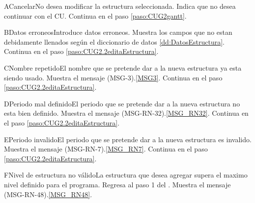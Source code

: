 	\begin{UCtrayectoriaA}{A}{Cancelar}{No desea modificar la estructura seleccionada.}
		\UCpaso[\UCactor] Indica que no desea continuar con el CU.
		\UCpaso Continua en el paso \ref{paso:CUG2gantt}.
	\end{UCtrayectoriaA}

	\begin{UCtrayectoriaA}{B}{Datos erroneos}{Introduce datos erroneos.}
		\UCpaso Muestra los campos que no estan debidamente llenados según el diccionario de datos \ref{dd:DatosEstructura}.
		\UCpaso Continua en el paso \ref{paso:CUG2.2editaEstructura}.
	\end{UCtrayectoriaA}

	\begin{UCtrayectoriaA}{C}{Nombre repetido}{El nombre que se pretende dar a la nueva estructura ya esta siendo usado.}
		\UCpaso Muestra el mensaje (MSG-3).\ref{MSG3}.
		\UCpaso Continua en el paso \ref{paso:CUG2.2editaEstructura}.
	\end{UCtrayectoriaA}

	\begin{UCtrayectoriaA}{D}{Periodo mal definido}{El periodo que se pretende dar a la nueva estructura no esta bien definido.}
		\UCpaso Muestra el mensaje (MSG-RN-32).\ref{MSG_RN32}.
		\UCpaso Continua en el paso \ref{paso:CUG2.2editaEstructura}.
	\end{UCtrayectoriaA}

	\begin{UCtrayectoriaA}{E}{Periodo invalido}{El periodo que se pretende dar a la nueva estructura es invalido.}
		\UCpaso Muestra el mensaje (MSG-RN-7).\ref{MSG_RN7}.
		\UCpaso Continua en el paso \ref{paso:CUG2.2editaEstructura}.
	\end{UCtrayectoriaA}

	\begin{UCtrayectoriaA}{F}{Nivel de estructura no válido}{La estructura que desea agregar supera el maximo nivel definido para el programa.}
		\UCpaso Regresa al paso 1 del .
		\UCpaso Muestra el mensaje (MSG-RN-48).\ref{MSG_RN48}.
	\end{UCtrayectoriaA}



